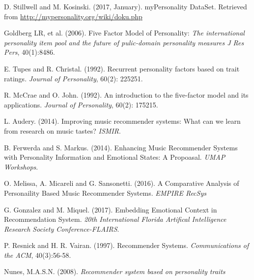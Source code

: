 \documentclass[conference]{IEEEtran}
\begin{document}

%
%
%
\begin{thebibliography}{1}
D. Stillwell and M. Kosinski. (2017, January). myPersonality DataSet. Retrieved from \url{ http://mypersonality.org/wiki/doku.php}

Goldberg LR, et al. (2006). Five Factor Model of Personality:  \textit{The international personality item pool and the future of pulic-domain personality measures J Res Pers}, 40(1):8486.

E. Tupes and R. Christal. (1992). Recurrent personality factors based on trait ratings. \textit{Journal of Personality}, 60(2): 225251.

R. McCrae and O. John. (1992). An introduction to the five-factor model and its applications. \textit{Journal of Personality}, 60(2): 175215.

L. Audery. (2014). Improving music recommender systems: What can we learn from research on music tastes? \textit{ISMIR}.

B. Ferwerda and S. Markus. (2014). Enhancing Music Recommender Systems with Personality Information and Emotional States: A Propoasal. \textit{UMAP Workshops}.

O. Melissa, A. Micareli and G. Sansonetti. (2016). A Comparative Analysis of Personaility Based Music Recommender Systems. \textit{EMPIRE RecSys}

G. Gonzalez and M. Miquel. (2017). Embedding Emotional Context in Recommendation System. \textit{20th International Florida Artifical Intelligence Research Society Conference-FLAIRS}.

P. Resnick and H. R. Vairan. (1997). Recommender Systems. \textit{Communications of the ACM}, 40(3):56-58.

Nunes, M.A.S.N. (2008). \textit{Recommender system based on personality traits}

\end{thebibliography}
\end{document}
